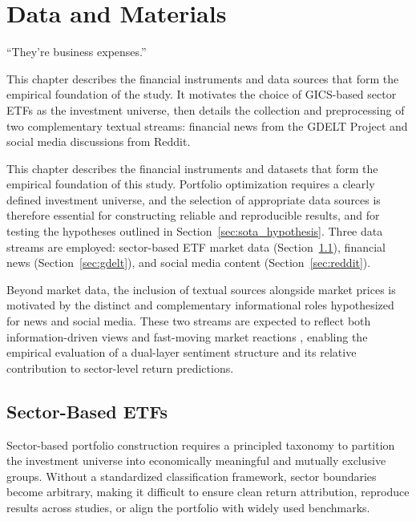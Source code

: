\chapter{Data and Materials}
\label{chapter:materials}

\begin{introduction}
\begin{flushright}
``They're business expenses.''
\end{flushright}

\vspace{0.5em}

This chapter describes the financial instruments and data sources that form the empirical foundation of the study. It motivates the choice of GICS-based sector ETFs as the investment universe, then details the collection and preprocessing of two complementary textual streams: financial news from the GDELT Project and social media discussions from Reddit.
\end{introduction}

This chapter describes the financial instruments and datasets that form the empirical foundation of this study. Portfolio optimization requires a clearly defined investment universe, and the selection of appropriate data sources is therefore essential for constructing reliable and reproducible results, and for testing the hypotheses outlined in Section~\ref{sec:sota_hypothesis}. Three data streams are employed: sector-based ETF market data (Section~\ref{sec:etfs}), financial news (Section~\ref{sec:gdelt}), and social media content (Section~\ref{sec:reddit}).

Beyond market data, the inclusion of textual sources alongside market prices is motivated by the distinct and complementary informational roles hypothesized for news and social media. These two streams are expected to reflect both information-driven views and fast-moving market reactions \cite{9d5c9}, enabling the empirical evaluation of a dual-layer sentiment structure and its relative contribution to sector-level return predictions.


\section{Sector-Based ETFs}
\label{sec:etfs}

Sector-based portfolio construction requires a principled taxonomy to partition the investment universe into economically meaningful and mutually exclusive groups. Without a standardized classification framework, sector boundaries become arbitrary, making it difficult to ensure clean return attribution, reproduce results across studies, or align the portfolio with widely used benchmarks.

